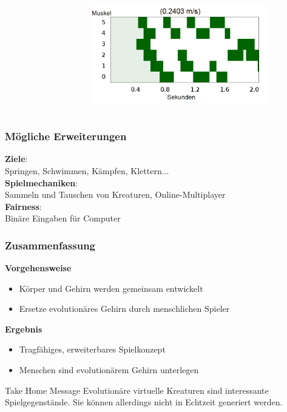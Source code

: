 \documentclass{beamer}
\begin{document}
\begin{frame}
\begin{columns}
\begin{figure}
		\end{figure}
		\begin{figure}
			\includegraphics[width=0.9\textwidth]{img/hum36.png}
		\end{figure}
	\end{columns}
\end{frame}

\begin{frame}
	\frametitle{Mögliche Erweiterungen}
	
	\textbf{Ziele}:\\ Springen, Schwimmen, Kämpfen, Klettern... \pause \\
	\vspace{2em}
	\textbf{Spielmechaniken}:\\ Sammeln und Tauschen von Kreaturen, Online-Multiplayer \pause \\
	\vspace{2em}
	\textbf{Fairness}:\\ Binäre Eingaben für Computer
\end{frame}

\begin{frame}
	\frametitle{Zusammenfassung}
	\pause
	\textbf{Vorgehensweise}
	\begin{itemize}
		\item Körper und Gehirn werden gemeinsam entwickelt \pause
		\item Ersetze evolutionäres Gehirn durch menschlichen Spieler \pause
	\end{itemize}
	\vspace{1em}
	\textbf{Ergebnis}
	\begin{itemize}
		\item Tragfähiges, erweiterbares Spielkonzept \pause
		\item Menschen sind evolutionärem Gehirn unterlegen \pause
	\end{itemize}
	\vspace{1em}
	\begin{block}{Take Home Message}
		Evolutionäre virtuelle Kreaturen sind interessante Spielgegenstände. Sie können allerdings nicht in Echtzeit generiert werden.
	\end{block}
	
\end{frame}
\end{document}
